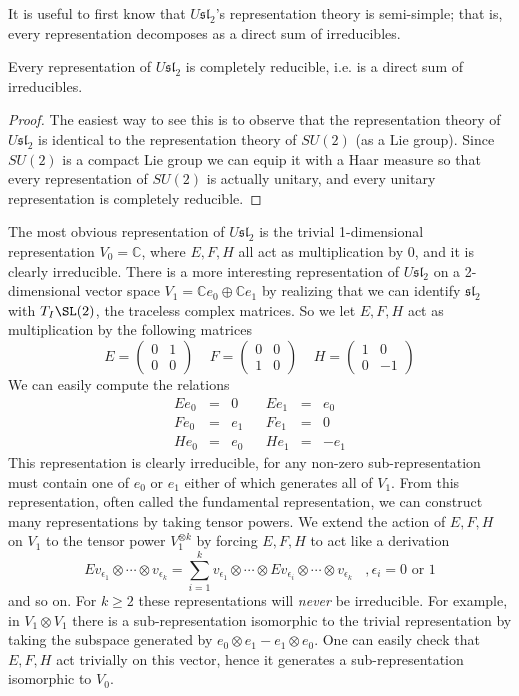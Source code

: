 It is useful to first know that $U\mathfrak{sl}_2$'s representation theory is semi-simple; that is, every representation decomposes as a direct sum of irreducibles.

\begin{thm}
Every representation of $U\mathfrak{sl}_2$ is completely reducible, i.e. is a direct sum of irreducibles.
\end{thm}
\begin{proof}
The easiest way to see this is to observe that the representation theory of $U\mathfrak{sl}_2$ is identical to the representation theory of $SU(2)$ (as a Lie group). Since $SU(2)$ is a compact Lie group we can equip it with a Haar measure so that every representation of $SU(2)$ is actually unitary, and every unitary representation is completely reducible.
\end{proof}

The most obvious representation of $U\mathfrak{sl}_2$ is the trivial 1-dimensional representation $V_0 = \mathbb C$, where $E,F,H$ all act as multiplication by 0, and it is clearly irreducible. There is a more interesting representation of $U\mathfrak{sl}_2$ on a 2-dimensional vector space $V_1 = \mathbb Ce_0 \oplus \mathbb Ce_1$ by realizing that we can identify $\mathfrak{sl}_2$ with $T_I \SL(2)$, the traceless complex matrices. So we let $E,F,H$ act as multiplication by the following matrices
\[ E = \begin{pmatrix} 0 & 1 \\ 0 & 0 \end{pmatrix} \ \ \ \ \ F = \begin{pmatrix} 0 & 0 \\ 1 & 0 \end{pmatrix} \ \ \ \ \ H = \begin{pmatrix} 1 & 0 \\ 0 & -1 \end{pmatrix} \]
We can easily compute the relations
\[
\begin{array}{rclcrcl}
 E e_0 &=& 0   & & E e_1 &=& e_0 \\
 F e_0 &=& e_1 & & F e_1 &=& 0   \\
 H e_0 &=& e_0 & & H e_1 &=& -e_1 
\end{array}
\]
This representation is clearly irreducible, for any non-zero sub-representation must contain one of $e_0$ or $e_1$ either of which generates all of $V_1$. From this representation, often called the fundamental representation, we can construct many representations by taking tensor powers. We extend the action of $E,F,H$ on $V_1$ to the tensor power $V_1^{\otimes k}$ by forcing $E,F,H$ to act like a derivation
\[ E v_{\epsilon_1} \otimes \cdots \otimes v_{\epsilon_k} = \sum_{i=1}^k v_{\epsilon_1} \otimes \cdots \otimes E v_{\epsilon_i} \otimes \cdots \otimes v_{\epsilon_k} \ \ \ \ , \epsilon_i = 0 \text{ or } 1 \]
and so on. For $k \geq 2$ these representations will \emph{never} be irreducible. For example, in $V_1 \otimes V_1$ there is a sub-representation isomorphic to the trivial representation by taking the subspace generated by $e_0 \otimes e_1 - e_1 \otimes e_0$. One can easily check that $E,F,H$ act trivially on this vector, hence it generates a sub-representation isomorphic to $V_0$.

